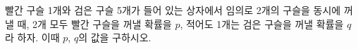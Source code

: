 빨간 구슬 1개와 검은 구슬 5개가 들어 있는 상자에서 임의로 2개의 구슬을 동시에 꺼낼 때, 2개 모두 빨간 구슬을 꺼낼 확률을 $p$, 적어도 1개는 검은 구슬을 꺼낼 확률을 $q$라 하자. 이때 $p$, $q$의 값을 구하시오.
